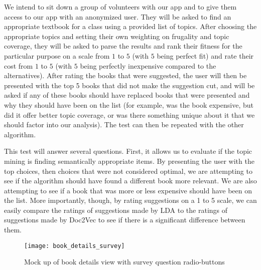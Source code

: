 We intend to sit down a group of volunteers with our app and to give them access to our app with an anonymized user.  
They will be asked to find an appropriate textbook for a class using a provided list of topics.  
After choosing the appropriate topics and setting their own weighting on frugality and topic coverage, they will be asked to parse the results and rank their fitness for the particular purpose on a scale from $1$ to $5$ (with $5$ being perfect fit) and rate their cost from $1$ to $5$ (with $5$ being perfectly inexpensive compared to the alternatives).  
After rating the books that were suggested, the user will then be presented with the top 5 books that did not make the suggestion cut, and will be asked if any of these books should have replaced books that were presented and why they should have been on the list (for example, was the book expensive, but did it offer better topic coverage, or was there something unique about it that we should factor into our analysis).  
The test can then be repeated with the other algorithm.

This test will answer several questions.  
First, it allows us to evaluate if the topic mining is finding semantically appropriate items.  
By presenting the user with the top choices, then choices that were not considered optimal, we are attempting to see if the algorithm should have found a different book more relevant.  
We are also attempting to see if a book that was more or less expensive should have been on the list.  
More importantly, though, by rating suggestions on a 1 to 5 scale, we can easily compare the ratings of suggestions made by LDA to the ratings of suggestions made by Doc2Vec to see if there is a significant difference between them.  

\begin{figure}[ht]
\label{eval_plan:mockup_survey}
\caption{Mock up of book details view with survey question radio-buttons}
\centering
\texttt{[image: book\_details\_survey]}
\end{figure}

